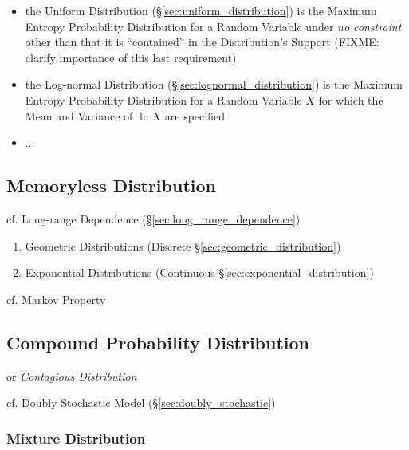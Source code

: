 \begin{itemize}
  \item the Uniform Distribution (\S\ref{sec:uniform_distribution}) is the
    Maximum Entropy Probability Distribution for a Random Variable under
    \emph{no constraint} other than that it is ``contained'' in the
    Distribution's Support (FIXME: clarify importance of this last requirement)
  \item the Log-normal Distribution (\S\ref{sec:lognormal_distribution}) is the
    Maximum Entropy Probability Distribution for a Random Variable $X$ for which
    the Mean and Variance of $\ln X$ are specified
  \item ...
\end{itemize}



\subsection{Memoryless Distribution}\label{sec:memoryless_distribution}

cf. Long-range Dependence (\S\ref{sec:long_range_dependence})

\begin{enumerate}
  \item Geometric Distributions (Discrete \S\ref{sec:geometric_distribution})
  \item Exponential Distributions (Continuous
    \S\ref{sec:exponential_distribution})
\end{enumerate}

cf. Markov Property



\subsection{Compound Probability Distribution}
\label{sec:compound_probability}

or \emph{Contagious Distribution}

cf. Doubly Stochastic Model (\S\ref{sec:doubly_stochastic})



\subsubsection{Mixture Distribution}\label{sec:mixture_distribution}

